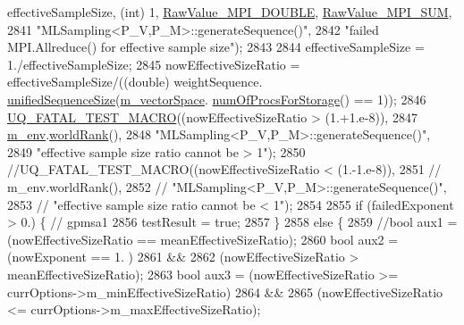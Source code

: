 \begin{DoxyCode}
      effectiveSampleSize, (\textcolor{keywordtype}{int}) 1, \hyperlink{_mpi_comm_8h_ad0f503bd9fecfe4e570ca3d15aaf2518}{RawValue\_MPI\_DOUBLE}, \hyperlink{_mpi_comm_8h_afbf78d291c032aa7f512bc566cee2bd1}{RawValue\_MPI\_SUM},
2841                                      \textcolor{stringliteral}{"MLSampling<P\_V,P\_M>::generateSequence()"},
2842                                      \textcolor{stringliteral}{"failed MPI.Allreduce() for effective sample size"});
2843 
2844         effectiveSampleSize = 1./effectiveSampleSize;
2845         nowEffectiveSizeRatio = effectiveSampleSize/((double) weightSequence.
      \hyperlink{class_q_u_e_s_o_1_1_scalar_sequence_a52829afc95e5c36e9db44f40854153b0}{unifiedSequenceSize}(\hyperlink{class_q_u_e_s_o_1_1_m_l_sampling_a7bc4c72f65ba9166ed94a6e198b0915b}{m\_vectorSpace}.
      \hyperlink{class_q_u_e_s_o_1_1_vector_space_a67b0c3620662116f5a346fdaa5faf38e}{numOfProcsForStorage}() == 1));
2846         \hyperlink{_defines_8h_a56d63d18d0a6d45757de47fcc06f574d}{UQ\_FATAL\_TEST\_MACRO}((nowEffectiveSizeRatio > (1.+1.e-8)),
2847                             \hyperlink{class_q_u_e_s_o_1_1_m_l_sampling_a13f1ca4fe9f94822fe572a743eaced1d}{m\_env}.\hyperlink{class_q_u_e_s_o_1_1_base_environment_a78b57112bbd0e6dd0e8afec00b40ffa7}{worldRank}(),
2848                             \textcolor{stringliteral}{"MLSampling<P\_V,P\_M>::generateSequence()"},
2849                             \textcolor{stringliteral}{"effective sample size ratio cannot be > 1"});
2850         \textcolor{comment}{//UQ\_FATAL\_TEST\_MACRO((nowEffectiveSizeRatio < (1.-1.e-8)),}
2851         \textcolor{comment}{//                    m\_env.worldRank(),}
2852         \textcolor{comment}{//                    "MLSampling<P\_V,P\_M>::generateSequence()",}
2853         \textcolor{comment}{//                    "effective sample size ratio cannot be < 1");}
2854 
2855         \textcolor{keywordflow}{if} (failedExponent > 0.) \{ \textcolor{comment}{// gpmsa1}
2856           testResult = \textcolor{keyword}{true};
2857         \}
2858         \textcolor{keywordflow}{else} \{
2859           \textcolor{comment}{//bool aux1 = (nowEffectiveSizeRatio == meanEffectiveSizeRatio);}
2860           \textcolor{keywordtype}{bool} aux2 = (nowExponent == 1.                             )
2861                       &&
2862                       (nowEffectiveSizeRatio > meanEffectiveSizeRatio);
2863           \textcolor{keywordtype}{bool} aux3 = (nowEffectiveSizeRatio >= currOptions->m\_minEffectiveSizeRatio)
2864                       &&
2865                       (nowEffectiveSizeRatio <= currOptions->m\_maxEffectiveSizeRatio);

\end{DoxyCode}
